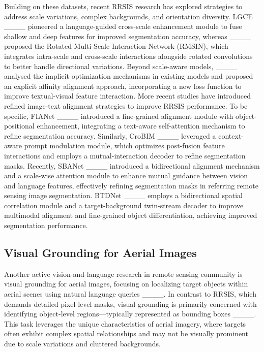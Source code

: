 Building on these datasets, recent RRSIS research has explored strategies to address scale variations, complex backgrounds, and orientation diversity. LGCE ____ pioneered a language-guided cross-scale enhancement module to fuse shallow and deep features for improved segmentation accuracy, whereas ____ proposed the Rotated Multi-Scale Interaction Network (RMSIN), which integrates intra-scale and cross-scale interactions alongside rotated convolutions to better handle directional variations. Beyond scale-aware models, ____ analysed the implicit optimization mechanisms in existing models and proposed an explicit affinity alignment approach, incorporating a new loss function to improve textual-visual feature interaction. More recent studies have introduced refined image-text alignment strategies to improve RRSIS performance. To be specific, FIANet ____ introduced a fine-grained alignment module with object-positional enhancement, integrating a text-aware self-attention mechanism to refine segmentation accuracy. Similarly, CroBIM ____ leveraged a context-aware prompt modulation module, which optimizes post-fusion feature interactions and employs a mutual-interaction decoder to refine segmentation masks. Recently, SBANet ____ introduced a bidirectional alignment mechanism and a scale-wise attention module to enhance mutual guidance between vision and language features, effectively refining segmentation masks in referring remote sensing image segmentation. BTDNet ____ employs a bidirectional spatial correlation module and a target-background twin-stream decoder to improve multimodal alignment and fine-grained object differentiation, achieving improved segmentation performance.

\subsection{Visual Grounding for Aerial Images}
\label{sec:2.3}
Another active vision-and-language research in
remote sensing community is visual grounding for aerial images, focusing on localizing target objects within aerial scenes using natural language queries ____. In contrast to RRSIS, which demands detailed pixel-level masks, visual grounding is primarily concerned with identifying object-level regions—typically represented as bounding boxes ____. This task leverages the unique characteristics of aerial imagery, where targets often exhibit complex spatial relationships and may not be visually prominent due to scale variations and cluttered backgrounds.

